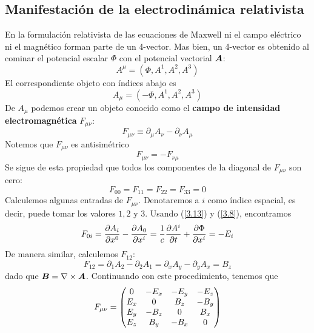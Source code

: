 \subsection{Manifestación de la electrodinámica relativista}\label{sec:3.3}
En la formulación relativista de las ecuaciones de Maxwell ni el campo eléctrico ni el magnético forman parte de un 4-vector. Mas bien, un 4-vector es obtenido al cominar el potencial escalar $\Phi$ con el potencial vectorial $\vb*{A}$:
\begin{equation}\label{3.11}
    A^\mu=(\Phi,A^1,A^2,A^3)
\end{equation}
El correspondiente objeto con índices abajo es
\begin{equation}\label{3.12}
    A_\mu=(-\Phi,A^1,A^2,A^3)
\end{equation}
De $A_\mu$ podemos crear un objeto conocido como el \textbf{campo de intensidad electromagnética} $F_{\mu\nu}$:
\begin{equation}\label{3.13}
    \boxed{F_{\mu\nu}\equiv \partial_\mu A_\nu-\partial_\nu A_\mu}
\end{equation}
Notemos que $F_{\mu\nu}$ es antisimétrico
\begin{equation}\label{3.14}
    F_{\mu\nu}=-F_{\nu\mu}
\end{equation}
Se sigue de esta propiedad que todos los componentes de la diagonal de $F_{\mu\nu}$ son cero:
\begin{equation}\label{3.15}
    F_{00}=F_{11}=F_{22}=F_{33}=0
\end{equation}
Calculemos algunas entradas de $F_{\mu\nu}$. Denotaremos a $i$ como índice espacial, es decir, puede tomar los valores $1,2$ y $3$. Usando (\ref{3.13}) y (\ref{3.8}), encontramos
\begin{equation}\label{3.16}
    F_{0i}=\pdv{A_i}{x^0}-\pdv{A_0}{x^{i}}=\frac{1}{c}\pdv{A^{i}}{t}+\pdv{\Phi}{x^{i}}=-E_i
\end{equation}
De manera similar, calculemos $F_{12}$:
\begin{equation}\label{3.17}
    F_{12}=\partial _1A_2-\partial_2A_1=\partial_x A_y-\partial_yA_x=B_z
\end{equation}
dado que $\vb*{B}=\nabla\times\vb*{A}$. Continuando con este procedimiento, tenemos que
\begin{equation}\label{3.18}
    F_{\mu\nu}=\mqty(0&-E_x&-E_y&-E_z\\E_x&0&B_z&-B_y\\E_y&-B_z&0&B_x\\E_z&B_y&-B_x&0)
\end{equation}
